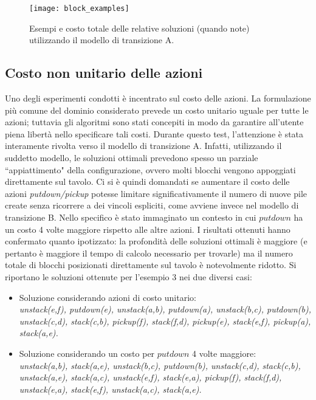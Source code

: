 \begin{figure}[h]
\centering
\texttt{[image: block\_examples]}
\caption{Esempi e costo totale delle relative soluzioni (quando note) utilizzando il modello di transizione A.}
\label{block_examples}
\end{figure}

\subsection{Costo non unitario delle azioni}
Uno degli esperimenti condotti è incentrato sul costo delle azioni. La formulazione più comune del dominio considerato prevede un costo unitario uguale per tutte le azioni; tuttavia gli algoritmi sono stati concepiti in modo da garantire all'utente piena libertà nello specificare tali costi. Durante questo test, l'attenzione è stata interamente rivolta verso il modello di transizione A. Infatti, utilizzando il suddetto modello, le soluzioni ottimali prevedono spesso un parziale ``appiattimento" della configurazione, ovvero molti blocchi vengono appoggiati direttamente sul tavolo. Ci si è quindi domandati se aumentare il costo delle azioni \textit{putdown/pickup} potesse limitare significativamente il numero di nuove pile create senza ricorrere a dei vincoli espliciti, come avviene invece nel modello di transizione B. Nello specifico è stato immaginato un contesto in cui $putdown$ ha un costo 4 volte maggiore rispetto alle altre azioni.
I risultati ottenuti hanno confermato quanto ipotizzato: la profondità delle soluzioni ottimali è maggiore (e pertanto è maggiore il tempo di calcolo necessario per trovarle) ma il numero totale di blocchi posizionati direttamente sul tavolo è notevolmente ridotto.
Si riportano le soluzioni ottenute per l'esempio 3 nei due diversi casi:

\begin{itemize}
\item Soluzione considerando azioni di costo unitario: \\
\textit{unstack(e,f), putdown(e), unstack(a,b), putdown(a), unstack(b,c), putdown(b), unstack(c,d), stack(c,b), pickup(f), stack(f,d), pickup(e), stack(e,f), pickup(a), stack(a,e).}
\item Soluzione considerando un costo per $putdown$ 4 volte maggiore: \\
\textit{unstack(a,b), stack(a,e), unstack(b,c), putdown(b), unstack(c,d), stack(c,b), unstack(a,e), stack(a,c), unstack(e,f),
stack(e,a), pickup(f), stack(f,d), unstack(e,a), stack(e,f), unstack(a,c), stack(a,e).}
\end{itemize}

